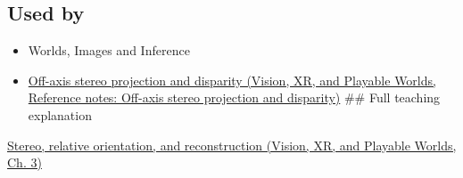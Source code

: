 \subsection{Used by}\label{appendix-c4e98b6e4001-used-by}

\begin{itemize}
\item
  {Worlds, Images and Inference}
\item
  \href{../07-Vision-XR-and-Playable-Worlds/main.pdf\#nameddest=appendix-0976e86e5b9f}{Off-axis stereo projection and disparity (Vision, XR, and Playable Worlds, Reference notes: Off-axis stereo projection and disparity)} \#\# Full teaching explanation
\end{itemize}

\href{../07-Vision-XR-and-Playable-Worlds/main.pdf\#nameddest=04-visual-computing-ii-ch032-stereo-relative-orientation-and-reconstruction}{Stereo, relative orientation, and reconstruction (Vision, XR, and Playable Worlds, Ch. 3)}
